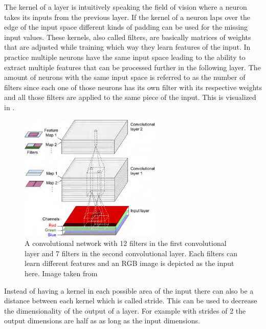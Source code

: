 The kernel of a layer is intuitively speaking the field of vision where a neuron takes its inputs from
the previous layer. If the kernel of a neuron laps over the edge
of the input space different kinds of padding can be used for the missing input values.
These kernels, also called filters, are basically matrices of weights that are
adjusted while training which way they learn features of the input. In practice multiple neurons have
the same input space leading to the ability to extract multiple features that can be processed
further in the following layer. The amount of neurons with the same input space is referred to as
the number of filters since each one of those neurons has its own filter with its respective
weights and all those filters are applied to the same piece of the input. This is visualized in
.

\begin{figure}[h]
    \centering
    \includegraphics[width=0.6\textwidth]{images/figures/convolutional_net_multiple_filters.png}
    \caption{A convolutional network with 12 filters in the first convolutional layer and 7
    filters in the second convolutional layer. Each filters can learn different features and an
    RGB image is depicted as the input here.
    Image taken from \parencite{2017-geron-homl}} \label{figure_cnn_filter}
\end{figure}

Instead of having a kernel in each possible area of the input there can also be a distance between
each kernel which is called stride. This can be used to decrease the dimensionality of the output
of a layer. For example with strides of 2 the output dimensions are half as as long as the input
dimensions.

